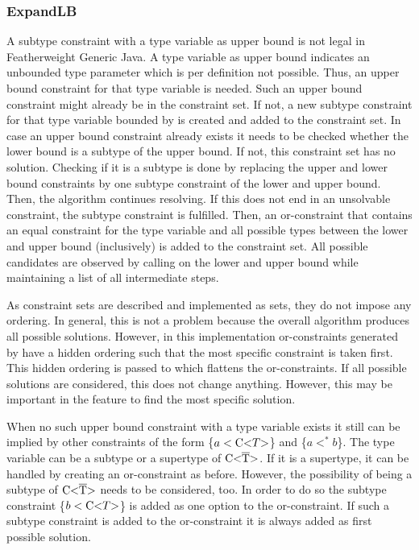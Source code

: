 \subsubsection{ExpandLB}
A subtype constraint with a type variable as upper bound is not legal in Featherweight Generic Java. A type variable as upper bound indicates an unbounded type parameter which is per definition not possible.
Thus, an upper bound constraint for that type variable is needed. Such an upper bound constraint might already be in the constraint set. If not, a new subtype constraint for that type variable bounded by  is created and added to the constraint set.
In case an upper bound constraint already exists it needs to be checked whether the lower bound is a subtype of the upper bound. If not, this constraint set has no solution. Checking if it is a subtype is done by replacing the upper and lower bound constraints by one subtype constraint of the lower and upper bound. Then, the algorithm continues resolving. If this does not end in an unsolvable constraint, the subtype constraint is fulfilled.
Then, an or-constraint that contains an equal constraint for the type variable and all possible types between the lower and upper bound (inclusively) is added to the constraint set. All possible candidates are observed by calling  on the lower and upper bound while maintaining a list of all intermediate steps.

As constraint sets are described and implemented as sets, they do not impose any ordering. In general, this is not a problem because the overall algorithm produces all possible solutions. However, in this implementation or-constraints generated by  have a hidden ordering such that the most specific constraint is taken first.
This hidden ordering is passed to  which flattens the or-constraints. If all possible solutions are considered, this does not change anything.
However, this may be important in the feature to find the most specific solution.

When no such upper bound constraint with a type variable exists it still can be implied by other constraints of the form \{$a < \text{C} \text{<} T \text{>}$\} and \{$a <^* b$\}. The type variable can be a subtype or a supertype of $\text{C<}\overline{\text{T}}\text{>}$. If it is a supertype, it can be handled by creating an or-constraint as before. However, the possibility of  being a subtype of $\text{C<}\overline{\text{T}}\text{>}$ needs to be considered, too.
In order to do so the subtype constraint \{$b < \text{C} \text{<} T \text{>}$\} is added as one option to the or-constraint. If such a subtype constraint is added to the or-constraint it is always added as first possible solution.

